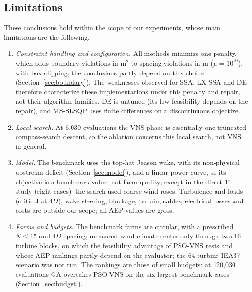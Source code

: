 \subsection{Limitations}
\label{sec:limits}
\label{sec:disc-recs}
These conclusions hold within the scope of our experiments, whose main limitations are the following.
\begin{enumerate}
\item \emph{Constraint handling and configuration.} All methods minimize one penalty, which adds boundary violations in m$^2$ to spacing violations in m ($\mu=10^{10}$), with box clipping; the conclusions partly depend on this choice (Section~\ref{sec:boundary}). The weaknesses observed for SSA, LX-SSA and DE therefore characterize these implementations under this penalty and repair, not their algorithm families. DE is untuned (its low feasibility depends on the repair), and MS-SLSQP uses finite differences on a discontinuous objective.
\item \emph{Local search.} At 6,030 evaluations the VNS phase is essentially one truncated compass-search descent, so the ablation concerns this local search, not VNS in general.
\item \emph{Model.} The benchmark uses the top-hat Jensen wake, with its non-physical upstream deficit (Section~\ref{sec:model}), and a linear power curve, so its objective is a benchmark value, not farm quality; except in the direct 1$^\circ$ study (eight cases), the search used coarse wind roses. Turbulence and loads (critical at $4D$), wake steering, blockage, terrain, cables, electrical losses and costs are outside our scope; all AEP values are gross.
\item \emph{Farms and budgets.} The benchmark farms are circular, with a prescribed $N\le15$ and $4D$ spacing; measured wind climates enter only through two 16-turbine blocks, on which the feasibility advantage of PSO-VNS rests and whose AEP rankings partly depend on the evaluator; the 64-turbine IEA37 scenario was not run. The rankings are those of small budgets: at 120,030 evaluations GA overtakes PSO-VNS on the six largest benchmark cases (Section~\ref{sec:budget}).

\end{enumerate}
